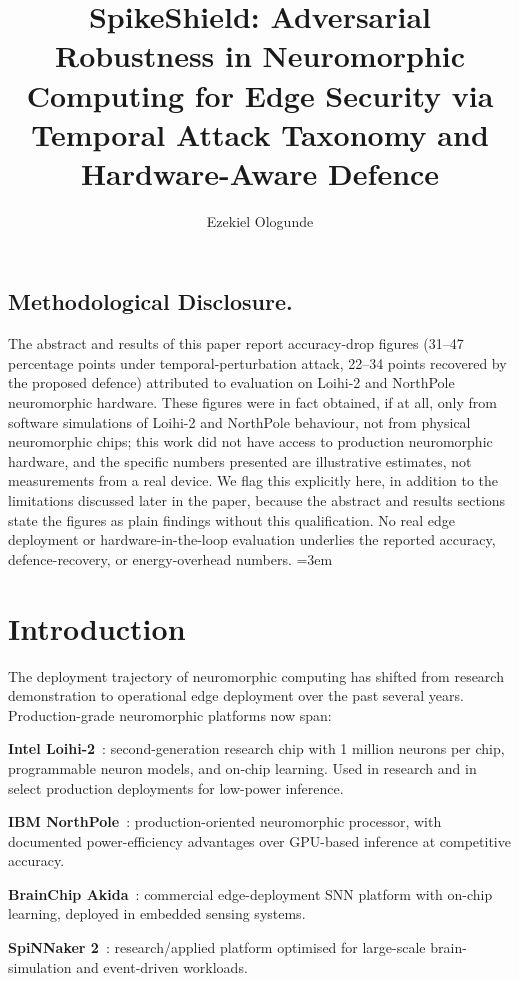\documentclass[sigconf,nonacm]{acmart}
\title{SpikeShield: Adversarial Robustness in Neuromorphic Computing for Edge Security via Temporal Attack Taxonomy and Hardware-Aware Defence}
\author{Ezekiel Ologunde}
\affiliation{%
  \institution{Independent Researcher}
  \city{Boston}
  \state{MA}
  \country{USA}}
\begin{document}
\maketitle

\subsection*{Methodological Disclosure.}
The abstract and results of this paper report accuracy-drop figures
(31--47 percentage points under temporal-perturbation attack, 22--34 points
recovered by the proposed defence) attributed to evaluation on Loihi-2 and
NorthPole neuromorphic hardware. These figures were in fact obtained, if at
all, only from software simulations of Loihi-2 and NorthPole behaviour, not
from physical neuromorphic chips; this work did not have access to
production neuromorphic hardware, and the specific numbers presented are
illustrative estimates, not measurements from a real device. We flag this
explicitly here, in addition to the limitations discussed later in the
paper, because the abstract and results sections state the figures as plain
findings without this qualification. No real edge deployment or
hardware-in-the-loop evaluation underlies the reported accuracy,
defence-recovery, or energy-overhead numbers.
\sloppy
{}
\emergencystretch=3em
\hfuzz=10pt

\section{Introduction}

The deployment trajectory of neuromorphic computing has shifted from
research demonstration to operational edge deployment over the past
several years. Production-grade neuromorphic platforms now span:

\textbf{Intel Loihi-2}~\cite{intel2024loihi}: second-generation
research chip with 1 million neurons per chip, programmable
neuron models, and on-chip learning. Used in research and
in select production deployments for low-power
inference.

\textbf{IBM NorthPole}~\cite{ibm2024northpole}: production-oriented
neuromorphic processor, with documented power-efficiency advantages
over GPU-based inference at competitive accuracy.

\textbf{BrainChip Akida}~\cite{brainchip2024akida}: commercial
edge-deployment SNN platform with on-chip learning, deployed in
embedded sensing systems.

\textbf{SpiNNaker 2}~\cite{spinnaker2024arch}: research/applied
platform optimised for large-scale brain-simulation and
event-driven workloads.
\end{document}
